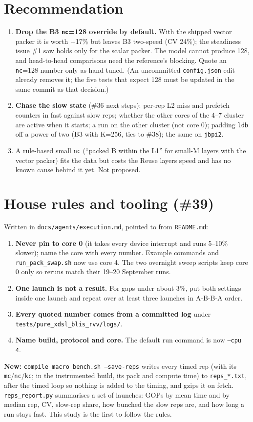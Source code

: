 \documentclass[10pt,a4paper]{article}
\begin{document}
\section{Recommendation}
\begin{enumerate}
  \item \textbf{Drop the B3 \texttt{nc}=128 override by default.} With the shipped vector packer it is worth
  $+$17\% but leaves B3 two-speed (CV 24\%); the steadiness issue \#1 saw holds only for the scalar packer. The model
  cannot produce 128, and head-to-head comparisons need the reference's blocking. Quote an \texttt{nc}=128 number only
  as hand-tuned. (An uncommitted \texttt{config.json} edit already removes it; the five tests that expect 128 must be
  updated in the same commit as that decision.)
  \item \textbf{Chase the slow state} (\#36 next steps): per-rep L2 miss and prefetch counters in fast against slow
  reps; whether the other cores of the 4--7 cluster are active when it starts; a run on the other cluster (not
  core 0); padding \texttt{ldb} off a power of two (B3 with K=256, ties to \#38); the same on \texttt{jbpi2}.
  \item A rule-based small \texttt{nc} (``packed B within the L1'' for small-M layers with the vector packer) fits
  the data but costs the Reuse layers speed and has no known cause behind it yet. Not proposed.
\end{enumerate}

\section{House rules and tooling (\#39)}
Written in \texttt{docs/agents/execution.md}, pointed to from \texttt{README.md}:
\begin{enumerate}
  \item \textbf{Never pin to core 0} (it takes every device interrupt and runs 5--10\% slower); name the core with
  every number. Example commands and \texttt{run\_pack\_swap.sh} now use core 4. The two overnight sweep scripts keep
  core 0 only so reruns match their 19--20 September runs.
  \item \textbf{One launch is not a result.} For gaps under about 3\%, put both settings inside one launch and repeat
  over at least three launches in A-B-B-A order.
  \item \textbf{Every quoted number comes from a committed log} under \texttt{tests/pure\_xdsl\_blis\_rvv/logs/}.
  \item \textbf{Name build, protocol and core.} The default run command is now \texttt{--cpu 4}.
\end{enumerate}
\textbf{New:} \texttt{compile\_macro\_bench.sh --save-reps} writes every timed rep (with its \texttt{mc}/\texttt{nc}/\texttt{kc};
in the instrumented build, its pack and compute time) to \texttt{reps\_*.txt}, after the timed loop so nothing is added
to the timing, and gzips it on fetch. \texttt{reps\_report.py} summarises a set of launches: GOPs by mean time and by
median rep, CV, slow-rep share, how bunched the slow reps are, and how long a run stays fast. This study is the
first to follow the rules.
\end{document}
